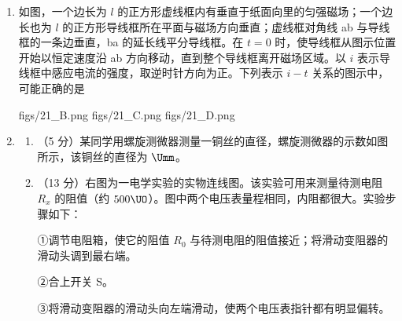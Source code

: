 \documentclass[\gkver]{gaokaozhenti}
\begin{document}
\begin{enumerate}
{用能量等于 $2.2\UMeV$ 的光子照射静止氘核时，氘核可能分解为一个质子和一个中子，它们的动能之和为零}
{用能量大于 $2.2\UMeV$ 的光子照射静止氘核时，氘核可能分解为一个质子和一个中子，它们的动能之和为零}
{用能量大于 $2.2\UMeV$ 的光子照射静止氘核时，氘核可能分解为一个质子和一个中子，它们的动能之和不为零}


\item
如图，一个边长为 $l$ 的正方形虚线框内有垂直于纸面向里的匀强磁场；一个边长也为 $l$ 的正方形导线框所在平面与磁场方向垂直；虚线框对角线 ab 与导线框的一条边垂直，ba 的延长线平分导线框。在 $t=0$ 时，使导线框从图示位置开始以恒定速度沿 ab 方向移动，直到整个导线框离开磁场区域。以 $i$ 表示导线框中感应电流的强度，取逆时针方向为正。下列表示 $i-t$ 关系的图示中，可能正确的是


{figs/21_B.png}
{figs/21_C.png}
{figs/21_D.png}


\item
\begin{enumerate}
	\item
	（5 分）某同学用螺旋测微器测量一铜丝的直径，螺旋测微器的示数如图所示，该铜丝的直径为  $\Umm$。


	\item
	（13 分）右图为一电学实验的实物连线图。该实验可用来测量待测电阻 $R_{x}$ 的阻值（约 $500\UO$）。图中两个电压表量程相同，内阻都很大。实验步骤如下：

	①调节电阻箱，使它的阻值 $R_{0}$ 与待测电阻的阻值接近；将滑动变阻器的滑动头调到最右端。

	②合上开关 S。

	③将滑动变阻器的滑动头向左端滑动，使两个电压表指针都有明显偏转。


\end{enumerate}
\end{enumerate}
\end{document}
